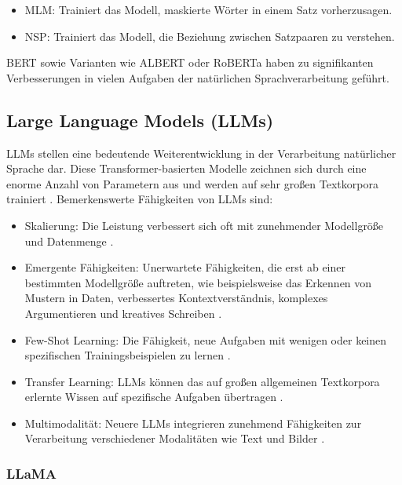 \begin{itemize}
	\item \gls{MLM}: Trainiert das Modell, maskierte Wörter in einem Satz vorherzusagen.
	\item \gls{NSP}: Trainiert das Modell, die Beziehung zwischen Satzpaaren zu verstehen.
\end{itemize}

\gls{BERT} \parencite{DevlinJacob2019BPoD} sowie Varianten wie ALBERT \parencite{LanZhenzhong2019AALB} oder RoBERTa \parencite{liu2019robertarobustlyoptimizedbert} haben zu signifikanten Verbesserungen in vielen Aufgaben der natürlichen Sprachverarbeitung geführt.

\subsection{Large Language Models (LLMs)}
\label{subsec:llms}

\glspl{LLM} stellen eine bedeutende Weiterentwicklung in der Verarbeitung natürlicher Sprache dar. Diese Transformer-basierten Modelle zeichnen sich durch eine enorme Anzahl von Parametern aus und werden auf sehr großen Textkorpora trainiert \parencite{VaswaniAshish2023AIAY}.
Bemerkenswerte Fähigkeiten von \glspl{LLM} sind:

\begin{itemize}
	\item Skalierung: Die Leistung verbessert sich oft mit zunehmender Modellgröße und Datenmenge \parencite{TouvronHugo2023LOaE}.
	\item Emergente Fähigkeiten: Unerwartete Fähigkeiten, die erst ab einer bestimmten Modellgröße auftreten, wie beispielsweise das Erkennen von Mustern in Daten, verbessertes Kontextverständnis, komplexes Argumentieren und kreatives Schreiben \parencite{BrownTomB2020LMaF}.
	\item Few-Shot Learning: Die Fähigkeit, neue Aufgaben mit wenigen oder keinen spezifischen Trainingsbeispielen zu lernen \parencite{BrownTomB2020LMaF}.
	\item Transfer Learning: \glspl{LLM} können das auf großen allgemeinen Textkorpora erlernte Wissen auf spezifische Aufgaben übertragen \parencite{DevlinJacob2019BPoD}.
	\item Multimodalität: Neuere \glspl{LLM} integrieren zunehmend Fähigkeiten zur Verarbeitung verschiedener Modalitäten wie Text und Bilder \parencite{LiJunnan2023BBLP}.
\end{itemize}

\subsubsection{LLaMA}
\label{subsubsec:LLaMA}

